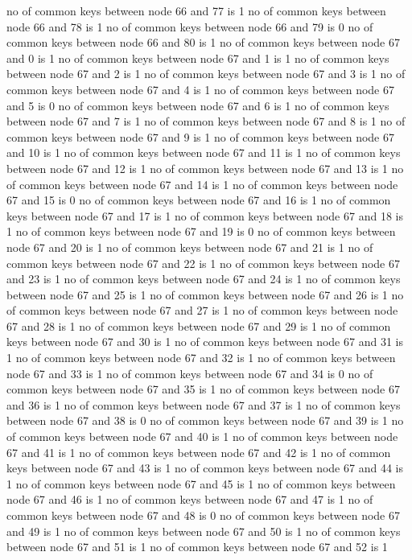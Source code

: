 no of common keys between node 66 and 77 is 1
no of common keys between node 66 and 78 is 1
no of common keys between node 66 and 79 is 0
no of common keys between node 66 and 80 is 1
no of common keys between node 67 and 0 is 1
no of common keys between node 67 and 1 is 1
no of common keys between node 67 and 2 is 1
no of common keys between node 67 and 3 is 1
no of common keys between node 67 and 4 is 1
no of common keys between node 67 and 5 is 0
no of common keys between node 67 and 6 is 1
no of common keys between node 67 and 7 is 1
no of common keys between node 67 and 8 is 1
no of common keys between node 67 and 9 is 1
no of common keys between node 67 and 10 is 1
no of common keys between node 67 and 11 is 1
no of common keys between node 67 and 12 is 1
no of common keys between node 67 and 13 is 1
no of common keys between node 67 and 14 is 1
no of common keys between node 67 and 15 is 0
no of common keys between node 67 and 16 is 1
no of common keys between node 67 and 17 is 1
no of common keys between node 67 and 18 is 1
no of common keys between node 67 and 19 is 0
no of common keys between node 67 and 20 is 1
no of common keys between node 67 and 21 is 1
no of common keys between node 67 and 22 is 1
no of common keys between node 67 and 23 is 1
no of common keys between node 67 and 24 is 1
no of common keys between node 67 and 25 is 1
no of common keys between node 67 and 26 is 1
no of common keys between node 67 and 27 is 1
no of common keys between node 67 and 28 is 1
no of common keys between node 67 and 29 is 1
no of common keys between node 67 and 30 is 1
no of common keys between node 67 and 31 is 1
no of common keys between node 67 and 32 is 1
no of common keys between node 67 and 33 is 1
no of common keys between node 67 and 34 is 0
no of common keys between node 67 and 35 is 1
no of common keys between node 67 and 36 is 1
no of common keys between node 67 and 37 is 1
no of common keys between node 67 and 38 is 0
no of common keys between node 67 and 39 is 1
no of common keys between node 67 and 40 is 1
no of common keys between node 67 and 41 is 1
no of common keys between node 67 and 42 is 1
no of common keys between node 67 and 43 is 1
no of common keys between node 67 and 44 is 1
no of common keys between node 67 and 45 is 1
no of common keys between node 67 and 46 is 1
no of common keys between node 67 and 47 is 1
no of common keys between node 67 and 48 is 0
no of common keys between node 67 and 49 is 1
no of common keys between node 67 and 50 is 1
no of common keys between node 67 and 51 is 1
no of common keys between node 67 and 52 is 1
